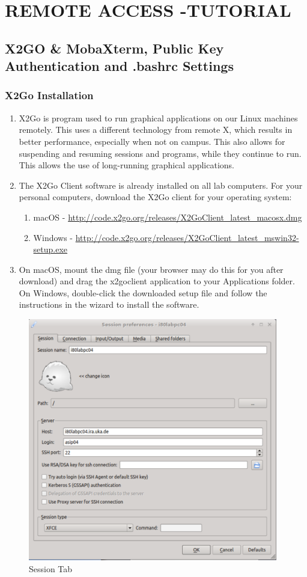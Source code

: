 \chapter*{REMOTE ACCESS -TUTORIAL}
\section*{X2GO \& MobaXterm, Public Key Authentication and .bashrc
	Settings}
\subsection{X2Go Installation}
\begin{enumerate}
	\item
	X2Go is program used to run graphical applications on our Linux
	machines remotely. This uses a different technology from remote X,
	which results in better performance, especially when not on campus.
	This also allows for suspending and resuming sessions and programs,
	while they continue to run. This allows the use of long-running
	graphical applications.
	\item
	The X2Go Client software is already installed on all lab computers.
	For your personal computers, download the X2Go client for your
	operating system:
		\begin{enumerate}[label*=\arabic*.]
		\item macOS - 		\url{http://code.x2go.org/releases/X2GoClient_latest_macosx.dmg}
		\item Windows - \url{http://code.x2go.org/releases/X2GoClient_latest_mswin32-setup.exe}
	\end{enumerate}
	\item
	On macOS, mount the dmg file (your browser may do this for you after
	download) and drag the x2goclient application to your Applications
	folder. On Windows, double-click the downloaded setup file and follow
	the instructions in the wizard to install the software.
\end{enumerate}
\begin{figure}
	\centering
	\includegraphics[width=4.28968in,height=4.17836in]{src/images/image1.png}
	\caption{Session Tab}
	\label{fig:fig1}
\end{figure}
